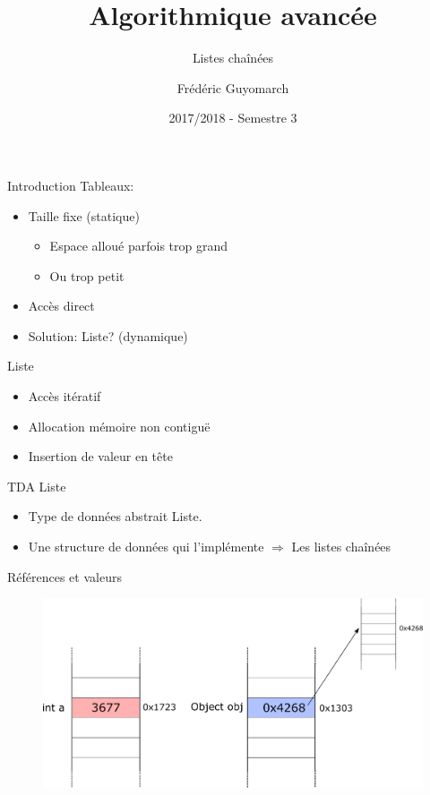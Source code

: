 \documentclass[12pt,a4paper]{beamer}
\title{\textbf{Algorithmique avancée}}
\subtitle{Listes chaînées}
\author{Frédéric Guyomarch}
\date{2017/2018 - Semestre 3}
\institute %
{

  Université de Lille1\\
  IUT-A de Lille

}
\begin{document}
\begin{frame}
\titlepage
\end{frame}

\begin{frame}{Introduction}
Tableaux:
\begin{itemize}
\item Taille fixe (statique)
\begin{itemize}
\item Espace alloué parfois trop grand
\item Ou trop petit
\end{itemize}
\item Accès direct
\item Solution: Liste? (dynamique)
\end{itemize}

\end{frame}

\begin{frame}{Liste}
\begin{itemize}
\item Accès itératif
\item Allocation mémoire non contiguë
\item Insertion de valeur en tête
\end{itemize}
\end{frame}

\begin{frame}{TDA Liste}
\begin{itemize}
\item Type de données abstrait Liste.
\item Une structure de données qui l'implémente $\Rightarrow$
Les listes chaînées

\end{itemize}

\end{frame}

\begin{frame}{Références et valeurs}

\begin{figure}
\includegraphics[scale=0.3]{figs/memoire}
\end{figure}
\end{frame}
\end{document}
